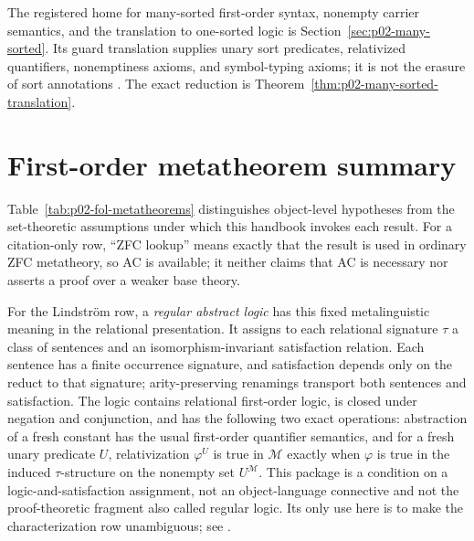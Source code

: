 The registered home for many-sorted first-order syntax, nonempty carrier
semantics, and the translation to one-sorted logic is
Section~\ref{sec:p02-many-sorted}.  Its guard translation supplies unary sort
predicates, relativized quantifiers, nonemptiness axioms, and symbol-typing
axioms; it is not the erasure of sort annotations \cite{Manzano1996}.  The
exact reduction is Theorem~\ref{thm:p02-many-sorted-translation}.

\section{First-order metatheorem summary}
\label{sec:p02-fol-metatheorem-summary}

Table~\ref{tab:p02-fol-metatheorems} distinguishes object-level hypotheses from
the set-theoretic assumptions under which this handbook invokes each result.
For a citation-only row, ``ZFC lookup'' means exactly that the result is used in
ordinary ZFC metatheory, so AC is available; it neither claims that AC is
necessary nor asserts a proof over a weaker base theory.

For the Lindstr\"om row, a \emph{regular abstract logic}
 has this fixed metalinguistic meaning in the
relational presentation.  It assigns to each relational signature \(\tau\) a
class of sentences and an isomorphism-invariant satisfaction relation.  Each
sentence has a finite occurrence signature, and satisfaction depends only on
the reduct to that signature; arity-preserving renamings transport both
sentences and satisfaction.  The logic contains relational first-order logic,
is closed under negation and conjunction, and has the following two exact
operations: abstraction of a fresh constant has the usual first-order
quantifier semantics, and for a fresh unary predicate \(U\), relativization
\(\varphi^{U}\) is true in \(\mathcal M\) exactly when \(\varphi\) is true in
the induced \(\tau\)-structure on the nonempty set \(U^{\mathcal M}\).  This
package is a condition on a logic-and-satisfaction assignment, not an
object-language connective and not the proof-theoretic fragment also called
regular logic.  Its only use here is to make the characterization row
unambiguous; see \cite[Chapter~XIII, \S1]{EbbinghausFlumThomas1994}.

